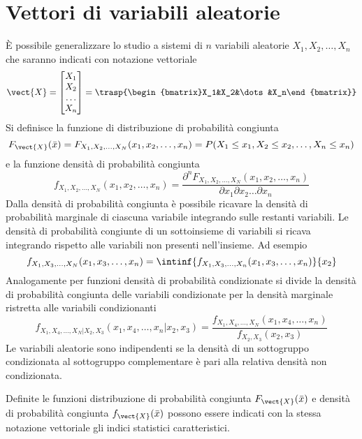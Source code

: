 \section{Vettori di variabili aleatorie}
\`{E} possibile generalizzare lo studio a sistemi di $n$ variabili aleatorie $X_1, X_2,\dots,X_n$ che saranno indicati con notazione vettoriale
\begin{equation}
	\vect{X}=\begin{bmatrix}X_1\\X_2\\\dots\\X_n\end{bmatrix}=\trasp{\begin{bmatrix}X_1&X_2&\dots&X_n\end{bmatrix}}
\end{equation}
Si definisce la funzione di distribuzione di probabilità congiunta
\begin{equation}
	F_\vect{X}(\bar{x})=F_{X_1,X_2,\dots,X_N}(x_1,x_2,\dots,x_n)=P(X_1\leq x_1,X_2\leq x_2,\dots,X_n\leq x_n)
\end{equation}
e la funzione densità di probabilità congiunta
\begin{equation}
	f_{X_1,X_2,\dots,X_N}(x_1,x_2,\dots,x_n)=\frac{\partial^n F_{X_1,X_2,\dots,X_N}(x_1,x_2,\dots,x_n)}{\partial x_1\partial x_2\dots\partial x_n}
\end{equation}
Dalla densità di probabilità congiunta è possibile ricavare la densità di probabilità marginale di ciascuna variabile integrando sulle restanti variabili. Le densità di probabilità congiunte di un sottoinsieme di variabili si ricava integrando rispetto alle variabili non presenti nell'insieme. Ad esempio
\begin{equation}
	f_{X_1,X_3,\dots,X_N}(x_1,x_3,\dots,x_n)=\intinf{f_{X_1,X_3,\dots,X_n}(x_1,x_3,\dots,x_n)}{x_2}
\end{equation}
Analogamente per funzioni densità di probabilità condizionate si divide la densità di probabilità congiunta delle variabili condizionate per la densità marginale ristretta alle variabili condizionanti
\begin{equation}
	f_{X_1,X_4,\dots,X_N|X_2,X_3}(x_1,x_4,\dots,x_n|x_2,x_3)=\frac{f_{X_1,X_4,\dots,X_N}(x_1,x_4,\dots,x_n)}{f_{X_2,X_3}(x_2,x_3)}
\end{equation}
Le variabili aleatorie sono indipendenti se la densità di un sottogruppo condizionata al sottogruppo complementare è pari alla relativa densità non condizionata.

Definite le funzioni distribuzione di probabilità congiunta $F_\vect{X}(\bar{x})$ e densità di probabilità congiunta $f_\vect{X}(\bar{x})$ possono essere indicati con la stessa notazione vettoriale gli indici statistici caratteristici.

